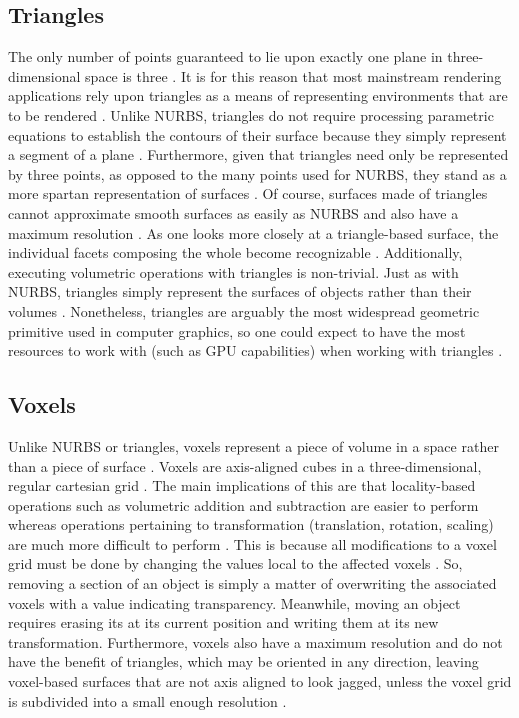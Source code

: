 \documentclass[onecolumn, draftclsnofoot,10pt, compsoc]{IEEEtran}
\begin{document}
\subsection{Triangles}

The only number of points guaranteed to lie upon exactly one plane in three-dimensional space is three \cite{1}.
It is for this reason that most mainstream rendering applications rely upon triangles as a means of representing environments that are to be rendered \cite{1}.
Unlike NURBS, triangles do not require processing parametric equations to establish the contours of their surface because they simply represent a segment of a plane \cite{1}.
Furthermore, given that triangles need only be represented by three points, as opposed to the many points used for NURBS, they stand as a more spartan representation of surfaces \cite{1}.
Of course, surfaces made of triangles cannot approximate smooth surfaces as easily as NURBS and also have a maximum resolution \cite{1}.
As one looks more closely at a triangle-based surface, the individual facets composing the whole become recognizable \cite{1}.
Additionally, executing volumetric operations with triangles is non-trivial. Just as with NURBS, triangles simply represent the surfaces of objects rather than their volumes \cite{1}.
Nonetheless, triangles are arguably the most widespread geometric primitive used in computer graphics, so one could expect to have the most resources to work with (such as GPU capabilities) when working with triangles \cite{1}.



\subsection{Voxels}

Unlike NURBS or triangles, voxels represent a piece of volume in a space rather than a piece of surface \cite{1}.
Voxels are axis-aligned cubes in a three-dimensional, regular cartesian grid \cite{1}.
The main implications of this are that locality-based operations such as volumetric addition and subtraction are easier to perform whereas operations pertaining to transformation (translation, rotation, scaling) are much more difficult to perform \cite{1}.
This is because all modifications to a voxel grid must be done by changing the values local to the affected voxels \cite{1}.
So, removing a section of an object is simply a matter of overwriting the associated voxels with a value indicating transparency.
Meanwhile, moving an object requires erasing its at its current position and writing them at its new transformation.
Furthermore, voxels also have a maximum resolution and do not have the benefit of triangles, which may be oriented in any direction, leaving voxel-based surfaces that are not axis aligned to look jagged, unless the voxel grid is subdivided into a small enough resolution \cite{1}.
\end{document}
